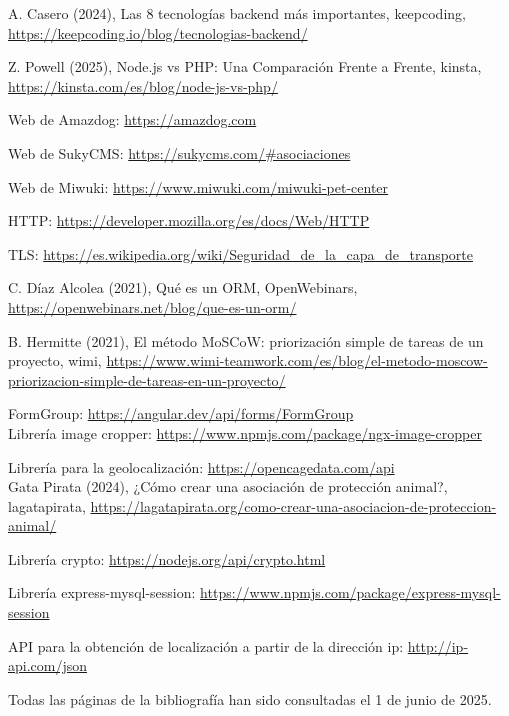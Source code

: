 \begin{thebibliography}{9}
A. Casero (2024), Las 8 tecnologías backend más importantes, keepcoding,  \href{https://keepcoding.io/blog/tecnologias-backend/}{https://keepcoding.io/blog/tecnologias-backend/}

Z. Powell (2025), Node.js vs PHP: Una Comparación Frente a Frente, kinsta, \href{https://kinsta.com/es/blog/node-js-vs-php/}{https://kinsta.com/es/blog/node-js-vs-php/}

Web de Amazdog: \href{https://amazdog.com}{https://amazdog.com}

Web de SukyCMS: \href{https://sukycms.com/\#asociaciones}{https://sukycms.com/\#asociaciones}

Web de Miwuki: \href{https://www.miwuki.com/miwuki-pet-center}{https://www.miwuki.com/miwuki-pet-center}

HTTP: \href{https://developer.mozilla.org/es/docs/Web/HTTP}{https://developer.mozilla.org/es/docs/Web/HTTP}

TLS: \href{https://es.wikipedia.org/wiki/Seguridad_de_la_capa_de_transporte}{https://es.wikipedia.org/wiki/Seguridad\_de\_la\_capa\_de\_transporte}

C. Díaz Alcolea (2021), Qué es un ORM, OpenWebinars, \href{https://openwebinars.net/blog/que-es-un-orm/}{https://openwebinars.net/blog/que-es-un-orm/}

B. Hermitte (2021), El método MoSCoW: priorización simple de tareas de un proyecto, wimi, \href{https://www.wimi-teamwork.com/es/blog/el-metodo-moscow-priorizacion-simple-de-tareas-en-un-proyecto/}{https://www.wimi-teamwork.com/es/blog/el-metodo-moscow-priorizacion-simple-de-tareas-en-un-proyecto/}



FormGroup: \href{https://angular.dev/api/forms/FormGroup}{https://angular.dev/api/forms/FormGroup}\\


Librería image cropper: \href{https://www.npmjs.com/package/ngx-image-cropper}{https://www.npmjs.com/package/ngx-image-cropper}

Librería para la geolocalización: \href{https://opencagedata.com/api}{https://opencagedata.com/api}\\

 Gata Pirata (2024), ¿Cómo crear una asociación de protección animal?, lagatapirata, \href{https://lagatapirata.org/como-crear-una-asociacion-de-proteccion-animal/}{https://lagatapirata.org/como-crear-una-asociacion-de-proteccion-animal/}

 Librería crypto: \href{https://nodejs.org/api/crypto.html}{https://nodejs.org/api/crypto.html}


 Librería express-mysql-session: \href{https://www.npmjs.com/package/express-mysql-session}{https://www.npmjs.com/package/express-mysql-session}

API para la obtención de localización a partir de la dirección ip: \href{http://ip-api.com/json}{http://ip-api.com/json}

\end{thebibliography}
Todas las páginas de la bibliografía han sido consultadas el 1 de junio de 2025.